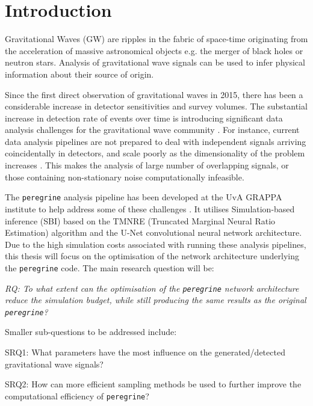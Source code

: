 \section{Introduction}
\label{sec:introduction}

Gravitational Waves (GW) are ripples in the fabric of space-time originating from the acceleration of massive astronomical objects e.g. the merger of black holes or neutron stars. Analysis of gravitational wave signals can be used to infer physical information about their source of origin. 

Since the first direct observation of gravitational waves in 2015, there has been a considerable increase in detector sensitivities and survey volumes. The substantial increase in detection rate of events over time is introducing significant data analysis challenges for the gravitational wave community \cite{bhardwaj2023peregrine}.
For instance, current data analysis pipelines are not prepared to deal with independent signals arriving coincidentally in detectors, and scale poorly as the dimensionality of the problem increases \cite{alvey2023things}. This makes the analysis of large number of overlapping signals, or those containing non-stationary noise computationally infeasible.

The \texttt{peregrine} analysis pipeline has been developed at the UvA GRAPPA institute to help address some of these challenges \cite{bhardwaj2023peregrine}. It utilises Simulation-based inference (SBI) based on the TMNRE (Truncated Marginal Neural Ratio Estimation) algorithm and the U-Net convolutional neural network architecture. Due to the high simulation costs associated with running these analysis pipelines, this thesis will focus on the optimisation of the network architecture underlying the \texttt{peregrine} code. The main research question will be: 

\noindent \textit{RQ: To what extent can the optimisation of the \texttt{peregrine} network architecture reduce the simulation budget, while still producing the same results as the original \texttt{peregrine}?}

Smaller sub-questions to be addressed include:

\noindent SRQ1: What parameters have the most influence on the generated/detected gravitational wave signals?

\noindent SRQ2: How can more efficient sampling methods be used to further improve the computational efficiency of \texttt{peregrine}?

